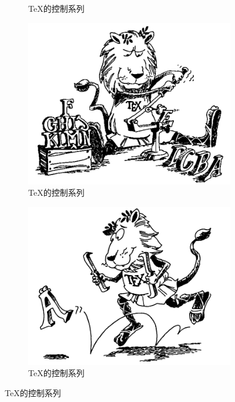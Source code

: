 \documentclass{myreport}
\begin{document}
\begin{figure}[htbp]
\begin{subfigure}[b]{.2\textwidth}
		\caption{\TeX 的控制系列}\label{subfig:1b}
	\end{subfigure}
	\begin{subfigure}[b]{.2\textwidth}
		\centering
		\includegraphics[width = \textwidth]{Chapter4}
		\caption{\TeX 的控制系列}\label{subfig:1c}
	\end{subfigure}
	\begin{subfigure}[b]{.2\textwidth}
		\centering
		\includegraphics[width = \textwidth]{Chapter5}
		\caption{\TeX 的控制系列}\label{subfig:1d}
	\end{subfigure}
	\label{fig:subfig_test1}
\end{figure}
\end{document}

